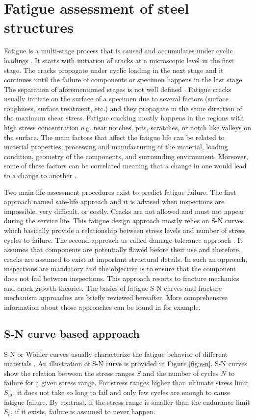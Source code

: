 \section{Fatigue assessment of steel structures}
\label{sec:fatigue}

\noindent
Fatigue is a multi-stage process that is caused and accumulates under cyclic loadings \citep{Ye2014}. It starts with initiation of cracks at a microscopic level in the first stage. The cracks 
propagate under cyclic loading in the next stage and it continues until the failure of components or specimen happens in the last stage. The separation of aforementioned stages is not well defined 
\citep{Ellyin1997}. Fatigue cracks usually initiate on the surface of a specimen due to several factors (surface roughness, surface treatment, etc.) and they propagate in the same direction 
of the maximum shear stress. 
Fatigue cracking mostly happens in the regions with high stress concentration e.g. near notches, pits, scratches, or notch like valleys on the surface. The main factors that affect the 
fatigue life can be related to material properties, processing and manufacturing of the material, loading condition, geometry of the components, and surrounding environment. Moreover, 
some of these factors can be correlated meaning that a change in one would lead to a change to another \citep{Fisher1998}. 

Two main life-assessment procedures exist to predict fatigue failure. The first approach named safe-life approach and it is advised when inspections are impossible, very difficult, or costly. 
Cracks are not allowed and must not appear during the service life. This fatigue design approach mostly relies on S-N curves which basically provide a relationship between stress levels and 
number of stress cycles to failure. The second approach us called damage-tolerance approach \citep{Ye2014}. It assumes that components are potentially flawed before their use and therefore,
cracks are assumed to exist at important structural details. In such an approach, inspections are mandatory and the objective is to ensure that the component does not fail between inspections. 
This approach resorts to fracture mechanics and crack growth theories. The basics of fatigue S-N curves and fracture mechanism approaches are briefly reviewed hereafter. More comprehensive
information about those approaches can be found in \citet{Ellyin1997, Fisher1998, lukic1999} for example. 

\subsection{S-N curve based approach}
\noindent
S-N or W\"ohler curves usually characterize the fatigue behavior of different materials \citep{SUSMEL20091074, SUSMEL20111075}. An illustration of S-N curve is provided in Figure 
\ref{fig:s-n}. S-N curves 
show the relation between the stress ranges $S$ and the number of cycles $N$ to failure for a given stress range. For stress ranges higher than ultimate stress limit $S_{ut}$, 
it does not take so long to fail and only few cycles are enough to cause fatigue failure. By contrast, if the stress range is smaller than the endurance limit $S_e$, if it exists,
failure is assumed to never happen. 


